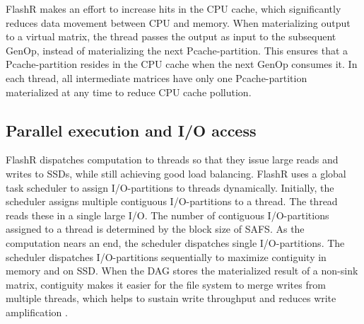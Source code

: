 FlashR makes an effort to increase hits in the CPU cache, which
significantly reduces data movement between CPU and memory.
When materializing output to a virtual matrix, the thread passes
the output as input to the subsequent
GenOp, instead of materializing the next Pcache-partition.
This ensures that a Pcache-partition resides in the CPU cache
when the next GenOp consumes it. 
In each thread, all intermediate matrices have only one 
Pcache-partition materialized
at any time to reduce CPU cache pollution.




\subsection{Parallel execution and I/O access}
FlashR dispatches computation to threads so that they
issue large reads and writes to SSDs, while still achieving good load balancing.
FlashR uses a global task scheduler to assign I/O-partitions to threads
dynamically. Initially, the scheduler assigns multiple contiguous I/O-partitions
to a thread. The thread reads these in a single large I/O.
The number of contiguous I/O-partitions assigned to a thread is determined by
the block size of SAFS.
As the computation nears an end, the scheduler dispatches single I/O-partitions. 
The scheduler dispatches I/O-partitions sequentially to maximize contiguity in memory
and on SSD. When the DAG stores the materialized result of a non-sink matrix,
contiguity makes it easier for the file system to merge
writes from multiple threads, which helps to sustain write throughput and reduces
write amplification \cite{ripq}.


